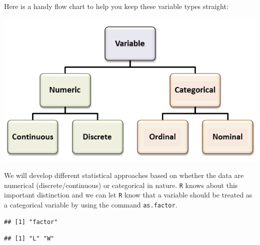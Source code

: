 \documentclass[
]{book}
\newenvironment{Shaded}{\begin{snugshade}}{\end{snugshade}}
\newcommand{\DocumentationTok}[1]{\textcolor[rgb]{0.56,0.35,0.01}{\textbf{\textit{#1}}}}
\newcommand{\FunctionTok}[1]{\textcolor[rgb]{0.00,0.00,0.00}{#1}}
\newcommand{\NormalTok}[1]{#1}
\newcommand{\OtherTok}[1]{\textcolor[rgb]{0.56,0.35,0.01}{#1}}
\newcommand{\SpecialCharTok}[1]{\textcolor[rgb]{0.00,0.00,0.00}{#1}}
\theoremstyle{definition}
\theoremstyle{definition}
\theoremstyle{definition}
\theoremstyle{definition}
\theoremstyle{remark}
\begin{document}
Here is a handy flow chart to help you keep these variable types straight:

\includegraphics{VariableTypes_Diagram.png}

We will develop different statistical approaches based on whether the data are numerical (discrete/continuous) or categorical in nature. \texttt{R} knows about this important distinction and we can let \texttt{R} know that a variable should be treated as a categorical variable by using the command \texttt{as.factor}.

\begin{Shaded}
\end{Shaded}

\begin{verbatim}
## [1] "factor"
\end{verbatim}

\begin{Shaded}
\end{Shaded}

\begin{verbatim}
## [1] "L" "W"
\end{verbatim}
\end{document}
